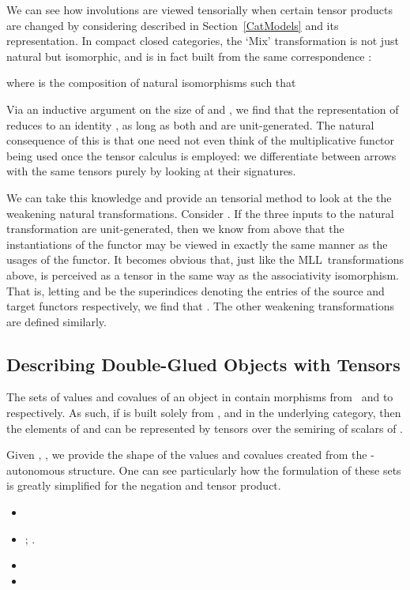 \documentclass{LMCS}
\theoremstyle{plain}\newtheorem*{cLm}{Claim}
\newcommand{\mll}{MLL} \newcommand{\mall}{MALL}
\newcommand{\p}{} \newcommand{\N}{\mathbb{N}}
\newcommand{\hughg}[1]{#1}
\begin{document}
\p We can see how involutions are viewed tensorially when certain tensor products are changed by considering  described in Section~\ref{CatModels} and its representation. In compact closed categories, the `Mix' transformation is not just natural but isomorphic, and is in fact built from the same correspondence :

where  is the composition of  natural isomorphisms such that

Via an inductive argument on the size of  and , we find that the  representation of  reduces to an identity , as long as both  and  are unit-generated. The natural consequence of this is that one need not even think of the multiplicative functor being used once the tensor calculus is employed: we differentiate between arrows with the same tensors purely by looking at their signatures.

\p We can take this knowledge and provide an tensorial method to look at the the weakening natural transformations. Consider . If the three inputs to the natural transformation are unit-generated, then we know from above that the instantiations of the  functor may be viewed in exactly the same manner as the usages of the  functor. It becomes obvious that, just like the \mll\ transformations above,  is perceived as a tensor in the same way as the associativity isomorphism. That is, letting  and  be the superindices denoting the  entries of the source and target functors respectively, we find that . The other weakening transformations are defined similarly.

\subsection{Describing Double-Glued Objects with Tensors} \label{SectionDGTensor}

\hughg{The sets of values and covalues of an object  in  contain morphisms from~ and to~ respectively. As such, if  is built solely from ,  and  in the underlying category, then the elements of  and  can be represented by tensors over the semiring of scalars of .}

\p Given , , we provide the shape of the values and covalues created from the -autonomous structure. One can see particularly how the formulation of these sets is greatly simplified for the negation and tensor product.

\begin{itemize}
\item 
\item ; .
\item 
\item 


\end{itemize}
\end{document}

